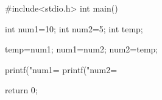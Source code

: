 #include<stdio.h>
int main()
{int num1=10;
 int num2=5;
 int temp;

 temp=num1;
 num1=num2;
 num2=temp;

 printf("num1=%
 printf("num2=%

 return 0;
 }

